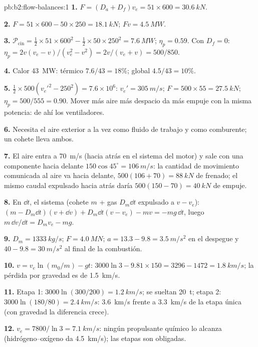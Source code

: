 \begin{solution}{pb:b2:flow-balances:1}
\textbf{1.} $F = (D_a + D_f)v_e = 51 \times 600 = \qty{30.6}{kN}$.

\textbf{2.} $F = 51 \times 600 - 50 \times 250 = \qty{18.1}{kN}$; $Fv = \qty{4.5}{MW}$.

\textbf{3.} $\mathcal P_{\text{cin}} = \tfrac12 \times 51 \times 600^2 - \tfrac12 \times 50 \times 250^2 =
\qty{7.6}{MW}$; $\eta_p = 0.59$. Con $D_f = 0$: $\eta_p = 2v(v_e - v)/(v_e^2 - v^2)
= 2v/(v_e + v) = 500/850$.

\textbf{4.} Calor \qty{43}{MW}: térmico $7.6/43 = 18\%$; global $4.5/43 = 10\%$.

\textbf{5.} $\tfrac12 \times 500(v_e'^2 - 250^2) = 7.6 \times 10^6$: $v_e' = \qty{305}{m/s}$;
$F = 500 \times 55 = \qty{27.5}{kN}$; $\eta_p = 500/555 = 0.90$. Mover más aire más
despacio da más empuje con la misma potencia: de ahí los ventiladores.

\textbf{6.} Necesita el aire exterior a la vez como fluido de trabajo y
como comburente; un cohete lleva ambos.

\textbf{7.} El aire entra a \qty{70}{m/s} (hacia atrás en el sistema del
motor) y sale con una componente hacia delante $150\cos45^\circ = \qty{106}{m/s}$: la
cantidad de movimiento comunicada al aire va hacia delante, $500(106 + 70) = \qty{88}{kN}$ de
frenado; el mismo caudal expulsado hacia atrás daría $500(150 - 70) =
\qty{40}{kN}$ de empuje.

\textbf{8.} En $\dd t$, el sistema (cohete $m$ + gas $D_m\dd t$ expulsado a
$v - v_e$): $(m - D_m\dd t)(v + \dd v) + D_m\dd t(v - v_e) - mv = -mg\,\dd t$,
luego $m\,\dd v/\dd t = D_mv_e - mg$.

\textbf{9.} $D_m = \qty{1333}{kg/s}$; $F = \qty{4.0}{MN}$; $a = 13.3 - 9.8 =
\qty{3.5}{m/s^2}$ en el despegue y $40 - 9.8 = \qty{30}{m/s^2}$ al final de la combustión.

\textbf{10.} $v = v_e\ln(m_0/m) - gt$: $3000\ln3 - 9.81 \times 150 = 3296 - 1472 =
\qty{1.8}{km/s}$; la pérdida por gravedad es de \qty{1.5}{km/s}.

\textbf{11.} Etapa 1: $3000\ln(300/200) = \qty{1.2}{km/s}$; se sueltan \qty{20}{t}; etapa
2: $3000\ln(180/80) = \qty{2.4}{km/s}$: \qty{3.6}{km/s} frente a \qty{3.3}{km/s}
de la etapa única (con gravedad la diferencia crece).

\textbf{12.} $v_e = 7800/\ln3 = \qty{7.1}{km/s}$: ningún propulsante químico
lo alcanza (hidrógeno--oxígeno da \qty{4.5}{km/s}); las etapas son obligadas.


\end{solution}
